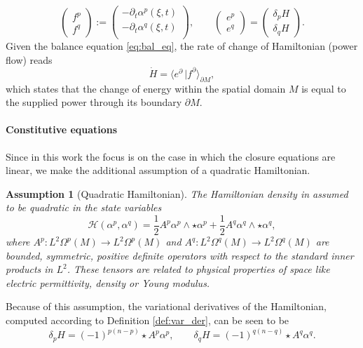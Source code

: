 \documentclass{elsarticle}
\newtheorem{assumption}{Assumption}
\newcommand{\dualpr}[3][]{\ensuremath{\langle #2 \, \vert #3 \rangle_{#1}}}
\begin{document}
\begin{equation}\label{eq:pHsys_flows_efforts}
\begin{pmatrix}
        f^p \\
        f^q
    \end{pmatrix} :=
    \begin{pmatrix}
        -\partial_t \alpha^p(\xi, t) \\
        -\partial_t \alpha^q(\xi, t) \\
    \end{pmatrix}, \qquad 
    \begin{pmatrix}
        e^p \\
        e^q
    \end{pmatrix} = 
    \begin{pmatrix}
        \delta_{p} H \\
        \delta_{q} H
    \end{pmatrix}.
\end{equation}
Given the balance equation \eqref{eq:bal_eq}, the rate of change of Hamiltonian (power flow) reads
\begin{equation}\label{eq:powbal}
    \dot{H} = \dualpr[\partial M]{e^\partial}{f^\partial},
\end{equation}
which states that the change of energy within the spatial domain $M$ is equal to the supplied power through its boundary $\partial M$.

\paragraph{Constitutive equations}
Since in this work the focus is on the case in which the closure equations are linear, we make the additional assumption of a quadratic Hamiltonian.
\begin{assumption}[Quadratic Hamiltonian]\label{ass:quad_Ham}
The Hamiltonian density in assumed to be quadratic in the state variables
\begin{equation}\label{eq:H_den}
\mathcal{H}(\alpha^p, \alpha^q) = 
    \frac{1}{2} A^p \alpha^p \wedge \star \alpha^p + \frac{1}{2}  A^q \alpha^q \wedge \star  \alpha^q,
\end{equation}
where $A^p: L^2\Omega^{p}(M) \rightarrow L^2\Omega^{p}(M)$ and $A^q: L^2\Omega^{q}(M) \rightarrow L^2\Omega^{q}(M)$ are bounded, symmetric, positive definite operators with respect to the standard inner products in $L^2$. These tensors are related to physical properties of space like electric permittivity, density or Young modulus.
\end{assumption}
Because of this assumption, the variational derivatives of the Hamiltonian, computed according to Definition \ref{def:var_der}, can be seen to be
\begin{equation}
    \delta_{p} H = (-1)^{p(n-p)}\star A^p\alpha^p, \qquad
    \delta_{q} H = (-1)^{q(n-q)}\star A^q\alpha^q.
\end{equation} 
\end{document}
